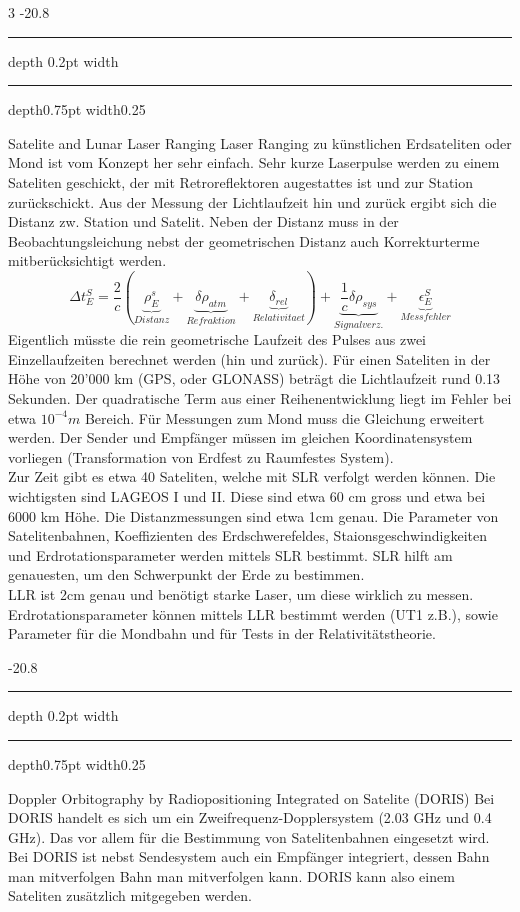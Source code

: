 \documentclass[8pt, landscape, fleqn]{scrartcl}
\makeatletter
\renewcommand{\subsection}{\@startsection{subsection}{1}{0mm}%
{-2\baselineskip}{0.8\baselineskip}%
{\hrule depth 0.2pt width\columnwidth\hrule depth0.75pt
width0.25\columnwidth\vspace*{1.2em}\large\bfseries\rmfamily}}
\makeatother
\begin{document}
\begin{multicols*}{3}
\subsection{Satelite and Lunar Laser Ranging}
Laser Ranging zu künstlichen Erdsateliten oder Mond ist vom Konzept her sehr einfach. Sehr kurze Laserpulse werden zu einem Sateliten geschickt, der mit Retroreflektoren augestattes ist und zur Station zurückschickt. Aus der Messung der Lichtlaufzeit hin und zurück ergibt sich die Distanz zw. Station und Satelit. Neben der Distanz muss in der Beobachtungsleichung nebst der geometrischen Distanz auch Korrekturterme mitberücksichtigt werden.
\begin{equation*}
    \Delta t_E^S = \frac{2}{c}\left( \underbrace{\rho_E^s}_{Distanz} + \underbrace{\delta \rho_{atm}}_{Refraktion} + \underbrace{\delta_{rel}}_{Relativitaet} \right) + \underbrace{\frac{1}{c} \delta \rho_{sys}}_{Signalverz.} + \underbrace{\epsilon_E^S}_{Messfehler}
\end{equation*}
Eigentlich müsste die rein geometrische Laufzeit des Pulses aus zwei Einzellaufzeiten berechnet werden (hin und zurück). Für einen Sateliten in der Höhe von 20'000 km (GPS, oder GLONASS) beträgt die Lichtlaufzeit rund 0.13 Sekunden. Der quadratische Term aus einer Reihenentwicklung liegt im Fehler bei etwa $10^{-4}m$ Bereich. Für Messungen zum Mond muss die Gleichung erweitert werden. Der Sender und Empfänger müssen im gleichen Koordinatensystem vorliegen (Transformation von Erdfest zu Raumfestes System). \\

Zur Zeit gibt es etwa 40 Sateliten, welche mit SLR verfolgt werden können. Die wichtigsten sind LAGEOS I und II. Diese sind etwa 60 cm gross und etwa bei 6000 km Höhe. Die Distanzmessungen sind etwa 1cm genau. Die Parameter von Satelitenbahnen, Koeffizienten des Erdschwerefeldes, Staionsgeschwindigkeiten und Erdrotationsparameter werden mittels SLR bestimmt. SLR hilft am genauesten, um den Schwerpunkt der Erde zu bestimmen. \\

LLR ist 2cm genau und benötigt starke Laser, um diese wirklich zu messen. Erdrotationsparameter können mittels LLR bestimmt werden (UT1 z.B.), sowie Parameter für die Mondbahn und für Tests in der Relativitätstheorie.

\subsection{Doppler Orbitography by Radiopositioning Integrated on Satelite (DORIS)}
Bei DORIS handelt es sich um ein Zweifrequenz-Dopplersystem (2.03 GHz und 0.4 GHz). Das vor allem für die Bestimmung von Satelitenbahnen eingesetzt wird. Bei DORIS ist nebst Sendesystem auch ein Empfänger integriert, dessen Bahn man mitverfolgen Bahn man mitverfolgen kann. DORIS kann also einem Sateliten zusätzlich mitgegeben werden. \\


\end{multicols*}
\end{document}
